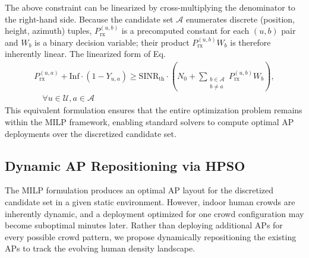 \documentclass[conference]{IEEEtran}
\begin{document}
The above constraint can be linearized by cross-multiplying the denominator to the right-hand side. Because the candidate set $\mathcal{A}$ enumerates discrete (position, height, azimuth) tuples, $P_{\text{rx}}^{(u,b)}$ is a precomputed constant for each $(u,b)$ pair and $W_b$ is a binary decision variable; their product $P_{\text{rx}}^{(u,b)} W_b$ is therefore inherently linear. The linearized form of Eq. \begin{equation}
\begin{split}
    P_{\text{rx}}^{(u,a)} + \text{Inf} \cdot (1 - Y_{u,a}) \ge \text{SINR}_{\text{th}} \cdot \left( N_0 + \sum_{\substack{b \in \mathcal{A} \\ b \ne a}} P_{\text{rx}}^{(u,b)} W_b \right), \\ 
    \quad \forall u \in \mathcal{U}, a \in \mathcal{A}
\end{split}
\label{eq:sinr_linear}
\end{equation}
This equivalent formulation ensures that the entire optimization problem remains within the MILP framework, enabling standard solvers to compute optimal AP deployments over the discretized candidate set.


\subsection{Dynamic AP Repositioning via HPSO}

The MILP formulation produces an optimal AP layout for the discretized candidate set in a given static environment. However, indoor human crowds are inherently dynamic, and a deployment optimized for one crowd configuration may become suboptimal minutes later. Rather than deploying additional APs for every possible crowd pattern, we propose dynamically repositioning the existing APs to track the evolving human density landscape.
\end{document}
